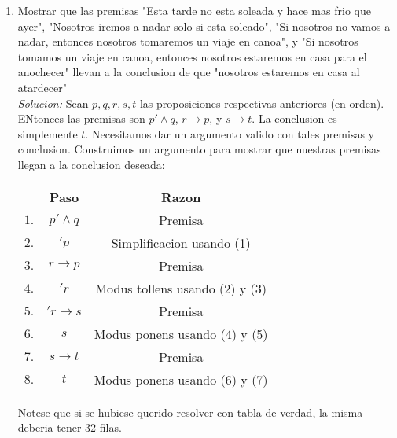 \documentclass[]{article}
\begin{document}
\begin{enumerate}
	\item Mostrar que las premisas "Esta tarde no esta soleada y hace mas frio que ayer", "Nosotros iremos a nadar solo si esta soleado", "Si nosotros no vamos a nadar, entonces nosotros tomaremos un viaje en canoa", y "Si nosotros tomamos un viaje en canoa, entonces nosotros estaremos en casa para el anochecer" llevan a la conclusion de que "nosotros estaremos en casa al atardecer"\\
	\textit{Solucion:} Sean $p, q, r, s, t$ las proposiciones respectivas anteriores (en orden). ENtonces las premisas son $p' \wedge q$, $r \rightarrow p$, y $s \rightarrow t$. La conclusion es simplemente $t$. Necesitamos dar un argumento valido con tales premisas y conclusion. Construimos un argumento para mostrar que nuestras premisas llegan a la conclusion deseada:

	\begin{table}[H]
		\begin{center}
			\begin{tabular}{ c c c }
				& \textbf{Paso} & \textbf{Razon}\\
				$1.$ & $p' \wedge q$ & Premisa\\
				$2.$ & $'p$ & Simplificacion usando (1)\\
				$3.$ & $r \rightarrow p$ & Premisa\\
				$4.$ & $'r$ & Modus tollens usando (2) y (3)\\
				$5.$ & $'r \rightarrow s$ & Premisa\\
				$6.$ & $s$ & Modus ponens usando (4) y (5)\\
				$7.$ & $s \rightarrow t$ & Premisa\\
				$8.$ & $t$ & Modus ponens usando (6) y (7)
			\end{tabular}
		\end{center}
	\end{table}
	Notese que si se hubiese querido resolver con tabla de verdad, la misma deberia tener 32 filas.


\end{enumerate}
\end{document}
